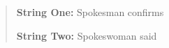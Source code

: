 
\begin{quote}
\textbf{String One: } Spokesman confirms

\textbf{String Two: } Spokeswoman said
\end{quote}